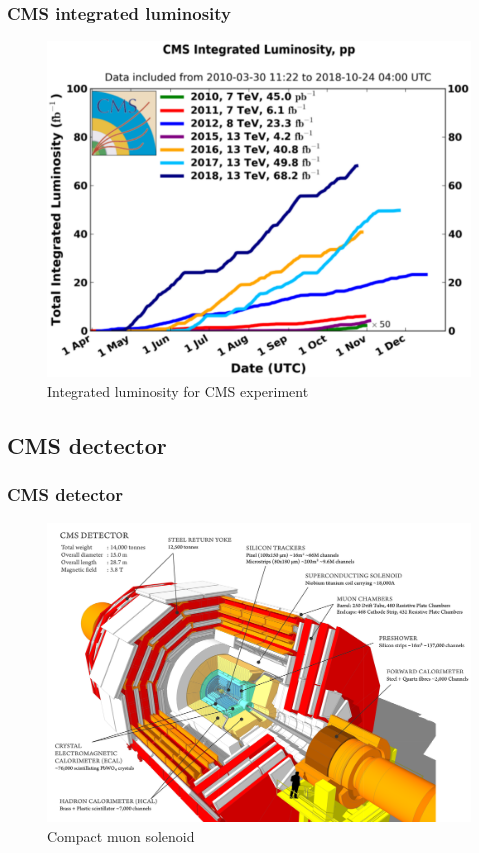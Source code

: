 \documentclass[11pt]{beamer}
\begin{document}
\begin{frame}
\frametitle{CMS integrated luminosity}
\begin{center}
	\begin{figure}
		\includegraphics[scale=0.3]{figures/cms_lumi.png}
		\caption*{Integrated luminosity for CMS experiment }
	\end{figure}
\end{center}
\end{frame}

\begin{frame}
\subsection{CMS dectector}
\frametitle{CMS detector}
\begin{center}
	\begin{figure}
		\includegraphics[scale=0.08]{figures/cms.png}
		\caption*{Compact muon solenoid}
	\end{figure}
\end{center}
\end{frame}
\end{document}
